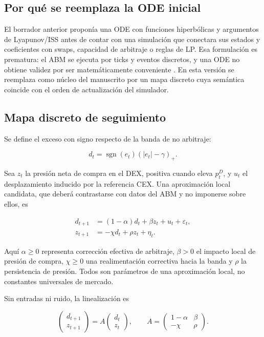 \subsection{Por qué se reemplaza la ODE inicial}

El borrador anterior proponía una ODE con funciones hiperbólicas y argumentos de
Lyapunov/ISS antes de contar con una simulación que conectara sus estados y
coeficientes con swaps, capacidad de arbitraje o reglas de LP. Esa formulación es
prematura: el ABM se ejecuta por ticks y eventos discretos, y una ODE no obtiene
validez por ser matemáticamente conveniente \cite{roubal2010linearization}. En esta versión se reemplaza como
núcleo del manuscrito por un mapa discreto cuya semántica coincide con el orden de
actualización del simulador.

\subsection{Mapa discreto de seguimiento}

Se define el exceso con signo respecto de la banda de no arbitraje:

\begin{equation}
  d_t=\operatorname{sgn}(e_t)(|e_t|-\gamma)_+.
\end{equation}

Sea $z_t$ la presión neta de compra en el DEX, positiva cuando eleva $p_t^D$, y $u_t$
el desplazamiento inducido por la referencia CEX. Una aproximación local candidata,
que deberá contrastarse con datos del ABM y no imponerse sobre ellos, es

\begin{align}
  d_{t+1}&=(1-\alpha)d_t+\beta z_t+u_t+\varepsilon_t,\\
  z_{t+1}&=-\chi d_t+\rho z_t+\eta_t.
\end{align}

Aquí $\alpha\geq0$ representa corrección efectiva de arbitraje, $\beta>0$ el impacto
local de presión de compra, $\chi\geq0$ una realimentación correctiva hacia la banda y
$\rho$ la persistencia de presión. Todos son parámetros de una aproximación local, no
constantes universales de mercado.

Sin entradas ni ruido, la linealización es

\begin{equation}
  \begin{pmatrix} d_{t+1}\\ z_{t+1} \end{pmatrix}
  =A\begin{pmatrix} d_t\\ z_t \end{pmatrix},\qquad
  A=\begin{pmatrix}1-\alpha&\beta\\-\chi&\rho\end{pmatrix}.
\end{equation}

